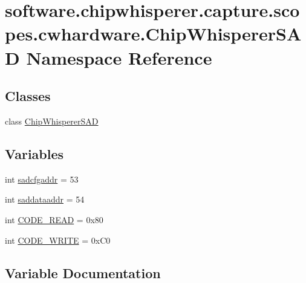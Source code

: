 \hypertarget{namespacesoftware_1_1chipwhisperer_1_1capture_1_1scopes_1_1cwhardware_1_1ChipWhispererSAD}{}\section{software.\+chipwhisperer.\+capture.\+scopes.\+cwhardware.\+Chip\+Whisperer\+S\+A\+D Namespace Reference}
\label{namespacesoftware_1_1chipwhisperer_1_1capture_1_1scopes_1_1cwhardware_1_1ChipWhispererSAD}
\subsection*{Classes}
\begin{DoxyCompactItemize}
\item 
class \hyperlink{classsoftware_1_1chipwhisperer_1_1capture_1_1scopes_1_1cwhardware_1_1ChipWhispererSAD_1_1ChipWhispererSAD}{Chip\+Whisperer\+S\+A\+D}
\end{DoxyCompactItemize}
\subsection*{Variables}
\begin{DoxyCompactItemize}
\item 
int \hyperlink{namespacesoftware_1_1chipwhisperer_1_1capture_1_1scopes_1_1cwhardware_1_1ChipWhispererSAD_ab44feaf52d503fd8d4f7f7e0949fb279}{sadcfgaddr} = 53
\item 
int \hyperlink{namespacesoftware_1_1chipwhisperer_1_1capture_1_1scopes_1_1cwhardware_1_1ChipWhispererSAD_a4f254c68ca42345ee1e16b405d2f583e}{saddataaddr} = 54
\item 
int \hyperlink{namespacesoftware_1_1chipwhisperer_1_1capture_1_1scopes_1_1cwhardware_1_1ChipWhispererSAD_a4d00e86df0b06d6926b6989122a6154a}{C\+O\+D\+E\+\_\+\+R\+E\+A\+D} = 0x80
\item 
int \hyperlink{namespacesoftware_1_1chipwhisperer_1_1capture_1_1scopes_1_1cwhardware_1_1ChipWhispererSAD_a7e857644d1a4303d9b35f7894f64ac77}{C\+O\+D\+E\+\_\+\+W\+R\+I\+T\+E} = 0x\+C0
\end{DoxyCompactItemize}


\subsection{Variable Documentation}
\hypertarget{namespacesoftware_1_1chipwhisperer_1_1capture_1_1scopes_1_1cwhardware_1_1ChipWhispererSAD_a4d00e86df0b06d6926b6989122a6154a}{}
